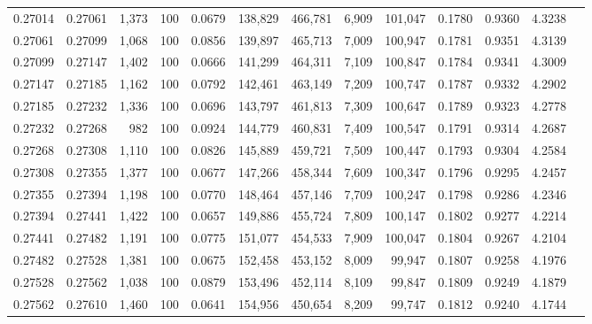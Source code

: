\begin{tabular}{rrrrrrrrrrrrr}
0.27014 & 0.27061 & 1,373 & 100 &                                     0.0679 & 138,829 & 466,781 &   6,909 & 101,047 & 0.1780 & 0.9360 & 4.3238 \\
0.27061 & 0.27099 & 1,068 & 100 &                                     0.0856 & 139,897 & 465,713 &   7,009 & 100,947 & 0.1781 & 0.9351 & 4.3139 \\
0.27099 & 0.27147 & 1,402 & 100 &                                     0.0666 & 141,299 & 464,311 &   7,109 & 100,847 & 0.1784 & 0.9341 & 4.3009 \\
0.27147 & 0.27185 & 1,162 & 100 &                                     0.0792 & 142,461 & 463,149 &   7,209 & 100,747 & 0.1787 & 0.9332 & 4.2902 \\
0.27185 & 0.27232 & 1,336 & 100 &                                     0.0696 & 143,797 & 461,813 &   7,309 & 100,647 & 0.1789 & 0.9323 & 4.2778 \\
0.27232 & 0.27268 &   982 & 100 &                                     0.0924 & 144,779 & 460,831 &   7,409 & 100,547 & 0.1791 & 0.9314 & 4.2687 \\
0.27268 & 0.27308 & 1,110 & 100 &                                     0.0826 & 145,889 & 459,721 &   7,509 & 100,447 & 0.1793 & 0.9304 & 4.2584 \\
0.27308 & 0.27355 & 1,377 & 100 &                                     0.0677 & 147,266 & 458,344 &   7,609 & 100,347 & 0.1796 & 0.9295 & 4.2457 \\
0.27355 & 0.27394 & 1,198 & 100 &                                     0.0770 & 148,464 & 457,146 &   7,709 & 100,247 & 0.1798 & 0.9286 & 4.2346 \\
0.27394 & 0.27441 & 1,422 & 100 &                                     0.0657 & 149,886 & 455,724 &   7,809 & 100,147 & 0.1802 & 0.9277 & 4.2214 \\
0.27441 & 0.27482 & 1,191 & 100 &                                     0.0775 & 151,077 & 454,533 &   7,909 & 100,047 & 0.1804 & 0.9267 & 4.2104 \\
0.27482 & 0.27528 & 1,381 & 100 &                                     0.0675 & 152,458 & 453,152 &   8,009 &  99,947 & 0.1807 & 0.9258 & 4.1976 \\
0.27528 & 0.27562 & 1,038 & 100 &                                     0.0879 & 153,496 & 452,114 &   8,109 &  99,847 & 0.1809 & 0.9249 & 4.1879 \\
0.27562 & 0.27610 & 1,460 & 100 &                                     0.0641 & 154,956 & 450,654 &   8,209 &  99,747 & 0.1812 & 0.9240 & 4.1744 \\

\end{tabular}
